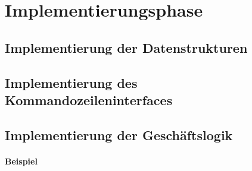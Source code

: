\section{Implementierungsphase} 
\label{sec:Implementierungsphase}

\subsection{Implementierung der Datenstrukturen}
\label{sec:ImplementierungDatenstrukturen}



\subsection{Implementierung des Kommandozeileninterfaces}
\label{sec:ImplementierungKommandozeileninterface}



\subsection{Implementierung der Geschäftslogik}
\label{sec:ImplementierungGeschaeftslogik}


\paragraph{Beispiel}


